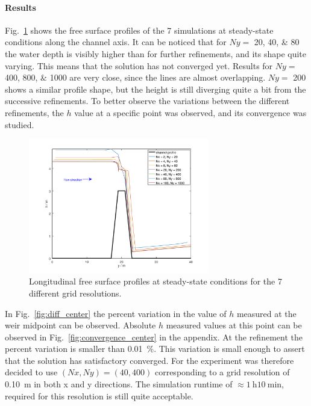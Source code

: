 \paragraph{Results} Fig.~\ref{fig:water_profiles} shows the free surface profiles of the \num{7} simulations at steady-state conditions along the channel axis.
It can be noticed that for $Ny =$ \numlist{20;40;80} the water depth is visibly higher than for further refinements, and its shape quite varying.
This means that the solution has not converged yet.
Results for $Ny =$ \numlist{400;800;1000} are very close, since the lines are almost overlapping.
$Ny =$ \num{200} shows a similar profile shape, but the height is still diverging quite a bit from the successive refinements.
To better observe the variations between the different refinements, the $h$ value at a specific point was observed, and its convergence was studied.

\begin{figure}[h]
  \centering
  \includegraphics[width=0.7\textwidth]{Figures/water_profiles.png}
  \caption{Longitudinal free surface profiles at steady-state conditions for the \num{7} different grid resolutions.}
  \label{fig:water_profiles}
\end{figure}

In Fig.~\ref{fig:diff_center} the percent variation in the value of $h$ measured at the weir midpoint can be observed. Absolute $h$ measured values at this point can be observed in Fig.~\ref{fig:convergence_center} in the appendix. 
At the  refinement the percent variation is smaller than \SI{0.01}{\percent}.
This variation is small enough to assert that the solution has satisfactory converged.
For the experiment was therefore decided to use $(Nx, Ny) = (\num{40}, \num{400})$ corresponding to a grid resolution of \SI{0.10}{\m} in both x and y directions. The simulation runtime of $\approx \SI{1}{\hour} \SI{10}{\minute}$, required for this resolution is still quite acceptable.

